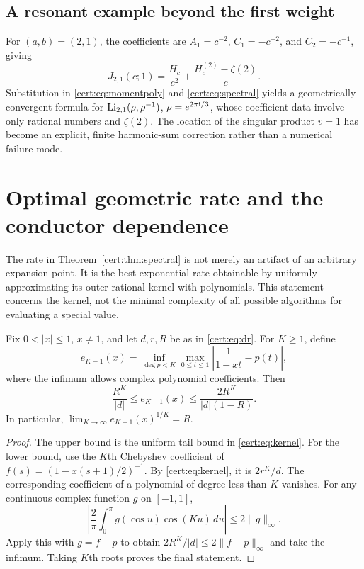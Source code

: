 \subsection{A resonant example beyond the first weight}
For $(a,b)=(2,1)$, the coefficients are
$A_1=c^{-2}$, $C_1=-c^{-2}$, and $C_2=-c^{-1}$, giving
\begin{equation}
 J_{2,1}(c;1)=\frac{H_c}{c^2}+\frac{H_c^{(2)}-\zeta(2)}{c}.
\label{cert:eq:J21}
\end{equation}
Substitution in \eqref{cert:eq:momentpoly} and \eqref{cert:eq:spectral} yields a
geometrically convergent formula for
$\operatorname{Li}_{2,1}(\rho,\rho^{-1})$, $\rho=e^{2\pi\mathrm{i}/3}$,
whose coefficient data involve only rational numbers and $\zeta(2)$.
The location of the singular product $v=1$ has become an explicit,
finite harmonic-sum correction rather than a numerical failure mode.

\section{Optimal geometric rate and the conductor dependence}
\label{cert:sec:optimal}
The rate in Theorem~\ref{cert:thm:spectral} is not merely an artifact of an
arbitrary expansion point. It is the best exponential rate obtainable
by uniformly approximating its outer rational kernel with polynomials.
This statement concerns the kernel, not the minimal complexity of all
possible algorithms for evaluating a special value.

\begin{theorem}
\label{cert:thm:optimal}
Fix $0<|x|\le1$, $x\ne1$, and let $d,r,R$ be as in \eqref{cert:eq:dr}.
For $K\ge1$, define
\[
 e_{K-1}(x)=\inf_{\deg p<K}\max_{0\le t\le1}
           \left|\frac1{1-xt}-p(t)\right|,
\]
where the infimum allows complex polynomial coefficients. Then
\begin{equation}
 \frac{R^K}{|d|}\le e_{K-1}(x)
       \le\frac{2R^K}{|d|(1-R)}.
\label{cert:eq:bestpoly}
\end{equation}
In particular,
$\lim_{K\to\infty}e_{K-1}(x)^{1/K}=R$.
\end{theorem}
\begin{proof}
The upper bound is the uniform tail bound in \eqref{cert:eq:kernel}.
For the lower bound, use the $K$th Chebyshev coefficient of
$f(s)=(1-x(s+1)/2)^{-1}$. By \eqref{cert:eq:kernel}, it is $2r^K/d$.
The corresponding coefficient of a polynomial of degree less than $K$
vanishes. For any continuous complex function $g$ on $[-1,1]$,
\[
 \left|\frac2\pi\int_0^\pi g(\cos u)\cos(Ku)\,du\right|
 \le2\|g\|_\infty.
\]
Apply this with $g=f-p$ to obtain
$2R^K/|d|\le2\|f-p\|_\infty$ and take the infimum.
Taking $K$th roots proves the final statement.
\end{proof}

